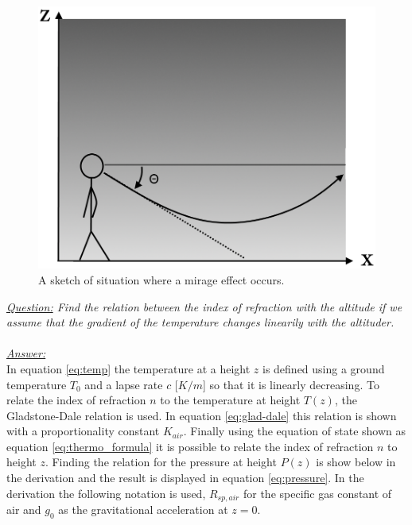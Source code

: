 \documentclass{article}
\begin{document}
\begin{figure}[h!]
	\centering
	\includegraphics[width=0.4\linewidth,keepaspectratio]{afbeeldingen/miraaj.png}
	\caption{A sketch of situation where a mirage effect occurs.}
	\label{fig:mirage}
\end{figure}
\textit{\underline{Question:} Find the relation between the index of refraction with the altitude if we assume that the gradient of the temperature changes linearily with the altituder.}\\
\\
\textit{\underline{Answer:}} \\
In equation \ref{eq:temp} the temperature at a height $z$ is defined using a ground temperature $T_0$ and a lapse rate $c$ [$K /m$] so that it is linearly decreasing. To relate the index of refraction $n$ to the temperature at height $T(z)$, the Gladstone-Dale relation is used. In equation \ref{eq:glad-dale} this relation is shown with a proportionality constant $K_{air}$. Finally using the equation of state shown as equation \ref{eq:thermo_formula} it is possible to relate the index of refraction $n$ to height $z$. Finding the relation for the pressure at height $P(z)$ is show below in the derivation and the result is displayed in equation \ref{eq:pressure}. In the derivation the following notation is used, $R_{sp,air}$ for the specific gas constant of air and $g_0$ as the gravitational acceleration at $z=0$.\\
\end{document}
